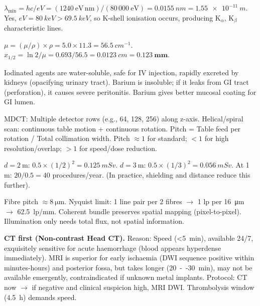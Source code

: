 \documentclass[11pt]{article}
\begin{document}
\begin{corrige}[Exercise 1]
$\lambda_{\min} = hc/eV = (1240\ \mathrm{eV\,nm}) / (80\,000\ \mathrm{eV}) = \SI{0.0155}{nm} = \SI{1.55e-11}{m}$. Yes, $eV = \SI{80}{keV} > \SI{69.5}{keV}$, so K-shell ionisation occurs, producing K$_\alpha$, K$_\beta$ characteristic lines.
\end{corrige}
\begin{corrige}[Exercise 2]
$\mu = (\mu/\rho) \times \rho = 5.0 \times 11.3 = \SI{56.5}{cm^{-1}}$. $x_{1/2} = \ln 2 / \mu = 0.693 / 56.5 = \SI{0.0123}{cm} = \mathbf{0.123\ mm}$.
\end{corrige}
\begin{corrige}[Exercise 3]
Iodinated agents are water-soluble, safe for IV injection, rapidly excreted by kidneys (opacifying urinary tract). Barium is insoluble; if it leaks from GI tract (perforation), it causes severe peritonitis. Barium gives better mucosal coating for GI lumen.
\end{corrige}
\begin{corrige}[Exercise 4]
MDCT: Multiple detector rows (e.g., 64, 128, 256) along z-axis. Helical/spiral scan: continuous table motion + continuous rotation. Pitch = Table feed per rotation / Total collimation width. Pitch $\approx 1$ for standard; $<1$ for high resolution/overlap; $>1$ for speed/dose reduction.
\end{corrige}
\begin{corrige}[Exercise 5]
$d=2\ \mathrm{m}$: $0.5 \times (1/2)^2 = \SI{0.125}{mSv}$. $d=3\ \mathrm{m}$: $0.5 \times (1/3)^2 = \SI{0.056}{mSv}$. At 1 m: $20 / 0.5 = 40$ procedures/year. (In practice, shielding and distance reduce this further).
\end{corrige}
\begin{corrige}[Exercise 6]
Fibre pitch $\approx \SI{8}{\micro\metre}$. Nyquist limit: 1 line pair per 2 fibres $\to$ 1 lp per \SI{16}{\micro\metre} $\to$ \SI{62.5}{lp/mm}. Coherent bundle preserves spatial mapping (pixel-to-pixel). Illumination only needs total flux, not spatial information.
\end{corrige}
\begin{corrige}[Exercise 7]
\textbf{CT first (Non-contrast Head CT).} Reason: Speed (\SI{<5}{min}), available 24/7, exquisitely sensitive for acute haemorrhage (blood appears hyperdense immediately). MRI is superior for early ischaemia (DWI sequence positive within minutes-hours) and posterior fossa, but takes longer (\SI{20}{--}\SI{30}{min}), may not be available emergently, contraindicated if unknown metal implants. Protocol: CT now $\to$ if negative and clinical suspicion high, MRI DWI. Thrombolysis window (\SI{4.5}{h}) demands speed.
\end{corrige}
\end{document}
